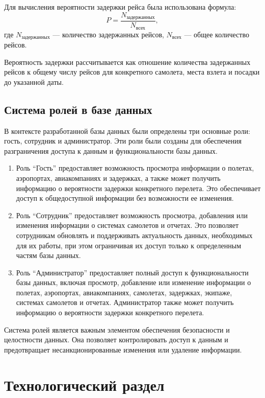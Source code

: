 Для вычисления вероятности задержки рейса была использована формула:
\begin{equation}
    P = \frac{N_{\text{задержанных}}}{N_{\text{всех}}}, \label{eq:prob}
\end{equation}
где $N_{\text{задержанных}}$ --- количество задержанных рейсов, $N_{\text{всех}}$ --- общее количество рейсов.

Вероятность задержки рассчитывается как отношение количества задержанных рейсов к общему числу рейсов для конкретного самолета, места взлета и посадки до указанной даты.

\section{Система ролей в базе данных}

В контексте разработанной базы данных были определены три основные роли: гость, сотрудник и администратор.
Эти роли были созданы для обеспечения разграничения доступа к данным и функциональности базы данных.

\begin{enumerate}[label=---]
    \item Роль ``Гость'' предоставляет возможность просмотра информации о полетах, аэропортах, авиакомпаниях и задержках, а также может получить информацию о вероятности задержки конкретного перелета.
    Это обеспечивает доступ к общедоступной информации без возможности ее изменения.
    \item Роль ``Сотрудник'' предоставляет возможность просмотра, добавления или изменения информации о системах самолетов и отчетах.
    Это позволяет сотрудникам обновлять и поддерживать актуальность данных, необходимых для их работы, при этом ограничивая их доступ только к определенным частям базы данных.
    \item Роль ``Администратор'' предоставляет полный доступ к функциональности базы данных, включая просмотр, добавление или изменение информации о полетах, аэропортах, авиакомпаниях, самолетах, задержках, экипаже, системах самолетов и отчетах.
    Администратор также может получить информацию о вероятности задержки конкретного перелета.
\end{enumerate}

Система ролей является важным элементом обеспечения безопасности и целостности данных.
Она позволяет контролировать доступ к данным и предотвращает несанкционированные изменения или удаление информации.

\chapter{Технологический раздел}

